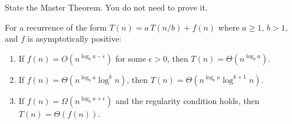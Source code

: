 \documentclass[
    language=english,
    doctype=homework,
    institution=none,
]{../../omnilatex}
\begin{document}
\begin{exercise}[5]
State the Master Theorem. You do not need to prove it.
\end{exercise}
\begin{solution}
For a recurrence of the form
$T(n) = a\,T(n/b) + f(n)$
where $a \ge 1$, $b > 1$, and $f$ is asymptotically positive:

\begin{enumerate}
    \item If $f(n) = O(n^{\log_b a - \epsilon})$ for some $\epsilon > 0$,
          then $T(n) = \Theta(n^{\log_b a})$.
    \item If $f(n) = \Theta(n^{\log_b a}\log^{k} n)$, then
          $T(n) = \Theta(n^{\log_b a}\log^{k+1} n)$.
    \item If $f(n) = \Omega(n^{\log_b a + \epsilon})$ and the regularity
          condition holds, then $T(n) = \Theta(f(n))$.
\end{enumerate}
\end{solution}
\end{document}
